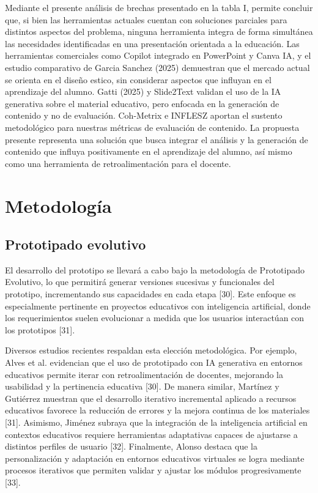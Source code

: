 \documentclass[11pt]{article}
\begin{document}
Mediante el presente análisis de brechas presentado en la tabla I, permite concluir que, si bien las herramientas actuales cuentan con soluciones parciales para distintos aspectos del problema, ninguna herramienta integra de forma simultánea las necesidades identificadas en una presentación orientada a la educación. Las herramientas comerciales como Copilot integrado en PowerPoint y Canva IA, y el estudio comparativo de Garcia Sanchez (2025) demuestran que el mercado actual se orienta en el diseño estico, sin considerar aspectos que influyan en el aprendizaje del alumno. Gatti (2025) y Slide2Text validan el uso de la IA generativa sobre el material educativo, pero enfocada en la generación de contenido y no de evaluación. Coh-Metrix e INFLESZ aportan el sustento metodológico para nuestras métricas de evaluación de contenido. La propuesta presente representa una solución que busca integrar el análisis y la generación de contenido que influya positivamente en el aprendizaje del alumno, así mismo como una herramienta de retroalimentación para el docente.


\newpage
\section*{Metodología}
\subsection*{Prototipado evolutivo}

El desarrollo del prototipo se llevará a cabo bajo la metodología de Prototipado Evolutivo, lo que permitirá generar versiones sucesivas y funcionales del prototipo, incrementando sus capacidades en cada etapa [30]. Este enfoque es especialmente pertinente en proyectos educativos con inteligencia artificial, donde los requerimientos suelen evolucionar a medida que los usuarios interactúan con los prototipos [31].

Diversos estudios recientes respaldan esta elección metodológica. Por ejemplo, Alves et al. evidencian que el uso de prototipado con IA generativa en entornos educativos permite iterar con retroalimentación de docentes, mejorando la usabilidad y la pertinencia educativa [30]. De manera similar, Martínez y Gutiérrez muestran que el desarrollo iterativo incremental aplicado a recursos educativos favorece la reducción de errores y la mejora continua de los materiales [31]. Asimismo, Jiménez subraya que la integración de la inteligencia artificial en contextos educativos requiere herramientas adaptativas capaces de ajustarse a distintos perfiles de usuario [32]. Finalmente, Alonso destaca que la personalización y adaptación en entornos educativos virtuales se logra mediante procesos iterativos que permiten validar y ajustar los módulos progresivamente [33].
\end{document}
